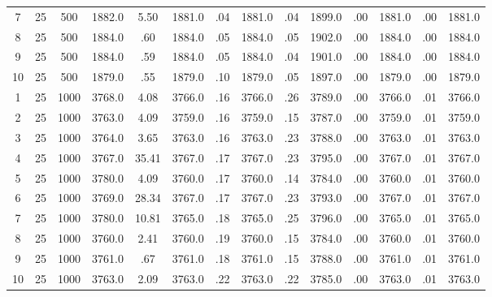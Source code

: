 \documentclass[12pt,a4paper]{article}
\begin{document}
\begin{center}
{\begin{tabular}{|ccc|cc|cc|cc|cc|cc|c|}
7             &  25& 500&   1882.0& 5.50&   1881.0&  .04&   1881.0&  .04&   1899.0&  .00&   1881.0&  .00&   1881.0\\[-0.01in]
8             &  25& 500&   1884.0&  .60&   1884.0&  .05&   1884.0&  .05&   1902.0&  .00&   1884.0&  .00&   1884.0\\[-0.01in]
9             &  25& 500&   1884.0&  .59&   1884.0&  .05&   1884.0&  .04&   1901.0&  .00&   1884.0&  .00&   1884.0\\[-0.01in]
10            &  25& 500&   1879.0&  .55&   1879.0&  .10&   1879.0&  .05&   1897.0&  .00&   1879.0&  .00&   1879.0\\[-0.01in]
1             &  25&1000&   3768.0& 4.08&   3766.0&  .16&   3766.0&  .26&   3789.0&  .00&   3766.0&  .01&   3766.0\\[-0.01in]
2             &  25&1000&   3763.0& 4.09&   3759.0&  .16&   3759.0&  .15&   3787.0&  .00&   3759.0&  .01&   3759.0\\[-0.01in]
3             &  25&1000&   3764.0& 3.65&   3763.0&  .16&   3763.0&  .23&   3788.0&  .00&   3763.0&  .01&   3763.0\\[-0.01in]
4             &  25&1000&   3767.0&35.41&   3767.0&  .17&   3767.0&  .23&   3795.0&  .00&   3767.0&  .01&   3767.0\\[-0.01in]
5             &  25&1000&   3780.0& 4.09&   3760.0&  .17&   3760.0&  .14&   3784.0&  .00&   3760.0&  .01&   3760.0\\[-0.01in]
6             &  25&1000&   3769.0&28.34&   3767.0&  .17&   3767.0&  .23&   3793.0&  .00&   3767.0&  .01&   3767.0\\[-0.01in]
7             &  25&1000&   3780.0&10.81&   3765.0&  .18&   3765.0&  .25&   3796.0&  .00&   3765.0&  .01&   3765.0\\[-0.01in]
8             &  25&1000&   3760.0& 2.41&   3760.0&  .19&   3760.0&  .15&   3784.0&  .00&   3760.0&  .01&   3760.0\\[-0.01in]
9             &  25&1000&   3761.0&  .67&   3761.0&  .18&   3761.0&  .15&   3788.0&  .00&   3761.0&  .01&   3761.0\\[-0.01in]
10            &  25&1000&   3763.0& 2.09&   3763.0&  .22&   3763.0&  .22&   3785.0&  .00&   3763.0&  .01&   3763.0\\[-0.01in]
\hline
\end{tabular}
 }
\end{center}
\newpage
\end{document}
